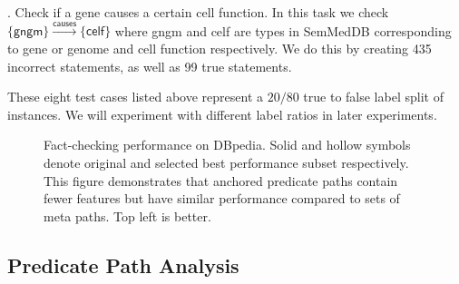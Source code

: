 \documentclass[reprint,twocolumn,showpacs,preprintnumbers,amsmath, aps,pre,amssymb]{revtex4-1}
\begin{document}
\vspace{5pt}. Check if a gene causes a certain cell function. In this task we check $\{\textsf{gngm}\}\xrightarrow{\textsf{causes}}\{\textsf{celf}\}$ where \textsf{gngm} and \textsf{celf} are types in SemMedDB corresponding to gene or genome and cell function respectively. We do this by creating 435 incorrect statements, as well as 99 true statements.

These eight test cases listed above represent a $20/80$ true to false label split of instances. We will experiment with different label ratios in later experiments.

\begin{figure}[t]
    \vspace{-1em}
    \quad
    \centering
    \caption{Fact-checking performance on DBpedia. Solid and hollow symbols denote original and selected best performance subset respectively. This figure demonstrates that anchored predicate paths contain fewer features but have similar performance compared to sets of meta paths. Top left is better.}
    \label{fig:metapath_predicatepath}
\end{figure}

\subsection{Predicate Path Analysis}
\end{document}
